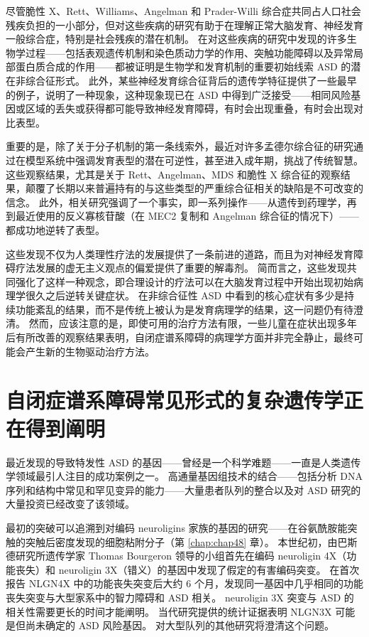 尽管脆性 X、Rett、Williams、Angelman 和 Prader-Willi 综合症共同占人口社会残疾负担的一小部分，但对这些疾病的研究有助于在理解正常大脑发育、神经发育 一般综合症，特别是社会残疾的潜在机制。 在对这些疾病的研究中发现的许多生物学过程——包括表观遗传机制和染色质动力学的作用、突触功能障碍以及异常局部蛋白质合成的作用——都被证明是生物学和发育机制的重要初始线索 ASD 的潜在非综合征形式。 此外，某些神经发育综合征背后的遗传学特征提供了一些最早的例子，说明了一种现象，这种现象现已在 ASD 中得到广泛接受——相同风险基因或区域的丢失或获得都可能导致神经发育障碍，有时会出现重叠，有时会出现对比表型。

重要的是，除了关于分子机制的第一条线索外，最近对许多孟德尔综合征的研究通过在模型系统中强调发育表型的潜在可逆性，甚至进入成年期，挑战了传统智慧。 这些观察结果，尤其是关于 Rett、Angelman、MDS 和脆性 X 综合征的观察结果，颠覆了长期以来普遍持有的与这些类型的严重综合征相关的缺陷是不可改变的信念。 此外，相关研究强调了一个事实，即一系列操作——从遗传到药理学，再到最近使用的反义寡核苷酸（在 MEC2 复制和 Angelman 综合征的情况下）——都成功地逆转了表型。

这些发现不仅为人类理性疗法的发展提供了一条前进的道路，而且为对神经发育障碍疗法发展的虚无主义观点的偏爱提供了重要的解毒剂。 简而言之，这些发现共同强化了这样一种观念，即合理设计的疗法可以在大脑发育过程中开始出现初始病理学很久之后逆转关键症状。 在非综合征性 ASD 中看到的核心症状有多少是持续功能紊乱的结果，而不是传统上被认为是发育病理学的结果，这一问题仍有待澄清。 然而，应该注意的是，即使可用的治疗方法有限，一些儿童在症状出现多年后有所改善的观察结果表明，自闭症谱系障碍的病理学方面并非完全静止，最终可能会产生新的生物驱动治疗方法。

\section{自闭症谱系障碍常见形式的复杂遗传学正在得到阐明}
最近发现的导致特发性 ASD 的基因——曾经是一个科学难题——一直是人类遗传学领域最引人注目的成功案例之一。 高通量基因组技术的结合——包括分析 DNA 序列和结构中常见和罕见变异的能力——大量患者队列的整合以及对 ASD 研究的大量投资已经改变了该领域。

最初的突破可以追溯到对编码 neuroligins 家族的基因的研究——在谷氨酰胺能突触的突触后密度发现的细胞粘附分子（第 \ref{chap:chap48} 章）。 本世纪初，由巴斯德研究所遗传学家 Thomas Bourgeron 领导的小组首先在编码 neuroligin 4X（功能丧失）和 neuroligin 3X（错义）的基因中发现了假定的有害编码突变。 在首次报告 NLGN4X 中的功能丧失突变后大约 6 个月，发现同一基因中几乎相同的功能丧失突变与大型家系中的智力障碍和 ASD 相关。 neuroligin 3X 突变与 ASD 的相关性需要更长的时间才能阐明。 当代研究提供的统计证据表明 NLGN3X 可能是但尚未确定的 ASD 风险基因。 对大型队列的其他研究将澄清这个问题。

